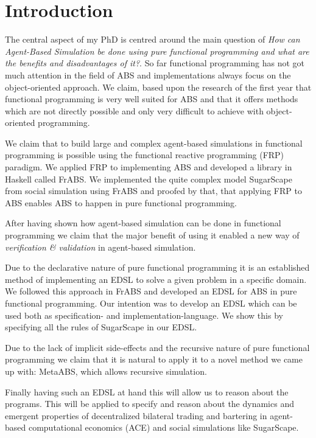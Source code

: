 \section{Introduction}

The central aspect of my PhD is centred around the main question of \textit{How can Agent-Based Simulation be done using pure functional programming and what are the benefits and disadvantages of it?}. So far functional programming has not got much attention in the field of ABS and implementations always focus on the object-oriented approach. We claim, based upon the research of the first year that functional programming is very well suited for ABS and that it offers methods which are not directly possible and only very difficult to achieve with object-oriented programming. 

We claim that to build large and complex agent-based simulations in functional programming is possible using the functional reactive programming (FRP) paradigm. We applied FRP to implementing ABS and developed a library in Haskell called FrABS. We implemented the quite complex model SugarScape from social simulation using FrABS and proofed by that, that applying FRP to ABS enables ABS to happen in pure functional programming.

After having shown how agent-based simulation can be done in functional programming we claim that the major benefit of using it enabled a new way of \textit{verification \& validation} in agent-based simulation. 

Due to the declarative nature of pure functional programming it is an established method of implementing an EDSL to solve a given problem in a specific domain. We followed this approach in FrABS and developed an EDSL for ABS in pure functional programming. Our intention was to develop an EDSL which can be used both as specification- and implementation-language. We show this by specifying all the rules of SugarScape in our EDSL.

Due to the lack of implicit side-effects and the recursive nature of pure functional programming we claim that it is natural to apply it to a novel method we came up with: MetaABS, which allows recursive simulation.

Finally having such an EDSL at hand this will allow us to reason about the programs. This will be applied to specify and reason about the dynamics and emergent properties of decentralized bilateral trading and bartering in agent-based computational economics (ACE) and social simulations like SugarScape.

